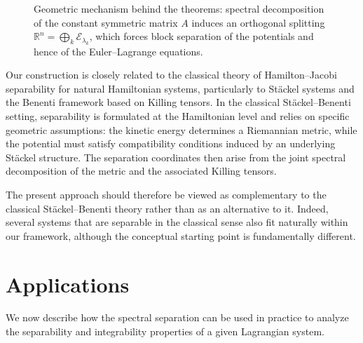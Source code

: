 \documentclass{rendiconti}
\begin{document}
\begin{figure}[h]
\caption{\small
Geometric mechanism behind the theorems:
spectral decomposition of the constant symmetric matrix $A$
induces an orthogonal splitting
$\mathbb{R}^n=\bigoplus_k \mathcal{E}_{\lambda_k}$,
which forces block separation of the potentials and hence of the Euler--Lagrange equations.
}
\label{fig:block-separation}
\end{figure}

Our construction is closely related to the classical theory of Hamilton--Jacobi separability for natural Hamiltonian systems, particularly to St\"{a}ckel systems and the Benenti framework based on Killing tensors. In the classical St\"{a}ckel--Benenti setting, separability is formulated at the Hamiltonian level and relies on specific geometric assumptions: the kinetic energy determines a Riemannian metric, while the potential must satisfy compatibility conditions induced by an underlying St\"{a}ckel structure. The separation coordinates then arise from the joint spectral decomposition of the metric and the associated Killing tensors.

The present approach should therefore be viewed as complementary to the classical St\"{a}ckel--Benenti theory rather than as an alternative to it. Indeed, several systems that are separable in the classical sense also fit naturally within our framework, although the conceptual starting point is fundamentally different.


\section{Applications}
\label{sec:app}

We now describe how the spectral separation can be used in practice to analyze the separability and integrability properties of a given Lagrangian system. 
\end{document}
